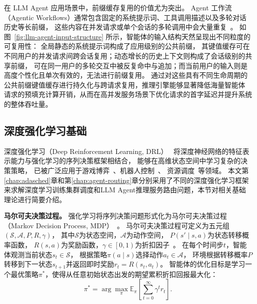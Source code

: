 在 LLM Agent 应用场景中，前缀缓存复用的价值尤为突出。
Agent 工作流（Agentic Workflows）通常包含固定的系统提示词、工具调用描述以及多轮对话历史等长前缀，
这些内容在并发请求或单个会话的多轮调用中会大量重复~\cite{lin2024parrot,pan2025kvflow}。
如图~\ref{fig:llm-agent-input-structure} 所示，智能体的输入结构天然呈现出不同粒度的可复用性：
全局静态的系统提示词构成了应用级别的公共前缀，
其键值缓存可在不同用户的并发请求间跨会话复用；动态增长的历史上下文则构成了会话级别的共享前缀，
可在同一用户的多轮交互中被反复命中与追加；而当前用户的输入则是高度个性化且单次有效的，无法进行前缀复用。
通过对这些具有不同生命周期的公共前缀键值缓存进行持久化与跨请求复用，推理引擎能够显著降低海量智能体
请求的预填充计算开销，从而在高并发服务场景下优化请求的首字延迟并提升系统的整体吞吐量。

\subsection{深度强化学习基础}\label{subsec:drl-basics}

深度强化学习（Deep Reinforcement Learning, DRL）~\cite{mnih2013playing,schulman2017proximal}
将深度神经网络的特征表示能力与强化学习的序列决策框架相结合，
能够在高维状态空间中学习复杂的决策策略，
已被广泛应用于游戏博弈~\cite{vinyals2019grandmaster}、机器人控制~\cite{levine2016end}、
资源调度~\cite{peng2021dl2}等领域。
本文第\ref{chap:adasched}章和第\ref{chap:agent-routing}章分别采用了不同的深度强化学习框架
来求解深度学习训练集群调度和LLM Agent推理服务路由问题，本节对相关基础理论进行简要介绍。

\textbf{马尔可夫决策过程。}
强化学习将序列决策问题形式化为马尔可夫决策过程（Markov Decision Process, MDP）~\cite{bellman1957markovian}。
马尔可夫决策过程可定义为五元组$\left(\mathcal{S}, \mathcal{A}, P, R, \gamma\right)$，
其中$\mathcal{S}$为状态空间，$\mathcal{A}$为动作空间，
$P\left(s' \mid s, a\right)$为状态转移概率函数，
$R\left(s, a\right)$为奖励函数，$\gamma \in \left[0, 1\right)$为折扣因子~\cite{kaelbling1996reinforcement}。
在每个时间步$t$，智能体观测当前状态$s_t \in \mathcal{S}$，
根据策略$\pi\left(a \mid s\right)$选择动作$a_t \in \mathcal{A}$，
环境根据转移概率$P$转移到下一状态$s_{t+1}$并返回即时奖励$r_t = R\left(s_t, a_t\right)$。
智能体的优化目标是学习一个最优策略$\pi^*$，使得从任意初始状态出发的期望累积折扣回报最大化：
\begin{equation}\label{eq:rl-objective}
    \pi^* = \arg\max_{\pi} \mathbb{E}_{\pi} \left[ \sum_{t=0}^{\infty} \gamma^t r_t \right].
\end{equation}


